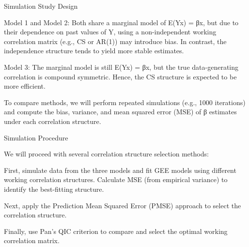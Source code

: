 \documentclass[
]{article}
\begin{document}
Simulation Study Design

Model 1 and Model 2: Both share a marginal model of E(Y\textbar x) = βx,
but due to their dependence on past values of Y, using a non-independent
working correlation matrix (e.g., CS or AR(1)) may introduce bias. In
contrast, the independence structure tends to yield more stable
estimates.

Model 3: The marginal model is still E(Y\textbar x) = βx, but the true
data-generating correlation is compound symmetric. Hence, the CS
structure is expected to be more efficient.

To compare methods, we will perform repeated simulations (e.g., 1000
iterations) and compute the bias, variance, and mean squared error (MSE)
of β estimates under each correlation structure.

Simulation Procedure

We will proceed with several correlation structure selection methods:

First, simulate data from the three models and fit GEE models using
different working correlation structures. Calculate MSE (from empirical
variance) to identify the best-fitting structure.

Next, apply the Prediction Mean Squared Error (PMSE) approach to select
the correlation structure.

Finally, use Pan's QIC criterion to compare and select the optimal
working correlation matrix.
\end{document}
